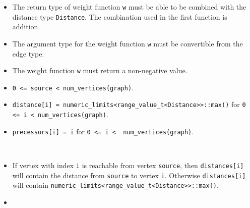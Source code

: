 \begin{itemdescr}
      \pnum\mandates
            \begin{itemize}
                  \item
                        The return type of weight function \lstinline{w} must be able to
                        be combined with the distance type \lstinline{Distance}. The combination
                        used in the first function is addition.
                  \item
                        The argument type for the weight
                        function \lstinline{w} must be convertible from the edge type.
                  \item
                        The weight function \lstinline{w} must return a non-negative value.
            \end{itemize}
      \pnum\preconditions
            \begin{itemize}
                  \item
                        \lstinline{0 <= source < num_vertices(graph)}. 
                        \\ 
                  \item
                        \lstinline{distance[i] = numeric_limits<range_value_t<Distance>>::max()}
                        for \lstinline{0 <= i < num_vertices(graph)}.  
                        \\ 
                  \item
                        \lstinline{precessors[i] = i} for \lstinline{0 <= i <  num_vertices(graph)}.
            \end{itemize}
      \pnum\effects \\
      \pnum\result
            \begin{itemize}
                  \item
                        If vertex with index \lstinline{i} is reachable from vertex \lstinline{source}, then
                        \lstinline{distances[i]} will contain the distance from \lstinline{source} to vertex
                        \lstinline{i}.  Otherwise \lstinline{distances[i]} will contain
                        \lstinline{numeric_limits<range_value_t<Distance>>::max()}.
                  \item

\end{itemize}
\end{itemdescr}

